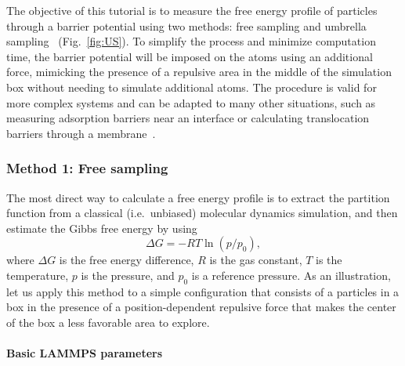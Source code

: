 \documentclass[9pt,tutorial]{livecoms}
\begin{document}
\noindent The objective of this tutorial is to measure the free energy profile
of particles through a barrier potential using two methods: free sampling and
umbrella sampling~\cite{kastner2011umbrella, allen2017computer, frenkel2023understanding} (Fig.~\ref{fig:US}).
To simplify the process and minimize computation time, the barrier potential will be
imposed on the atoms using an additional force, mimicking the presence of a repulsive
area in the middle of the simulation box without needing to simulate additional atoms.
The procedure is valid for more complex systems and can be adapted to many other
situations, such as measuring adsorption barriers near an interface or calculating
translocation barriers through a membrane~\cite{wilson1997adsorption, makarov2009computer,
gravelle2021adsorption, loche2022molecular, hayatifar2024probing}.

\subsubsection{Method 1: Free sampling}
The most direct way to calculate a free energy profile is to extract the partition
function from a classical (i.e.~unbiased) molecular dynamics simulation, and
then estimate the Gibbs free energy by using
\begin{equation}
\Delta G = -RT \ln(p/p_0),
\label{eq:G}
\end{equation}
where $\Delta G$ is the free energy difference, $R$ is the gas constant, $T$
is the temperature, $p$ is the pressure, and $p_0$ is a reference pressure.
As an illustration, let us apply this method to a simple configuration
that consists of a particles in a box in the presence of a
position-dependent repulsive force that makes the center of the box a less
favorable area to explore.

\paragraph{Basic LAMMPS parameters}
\end{document}
